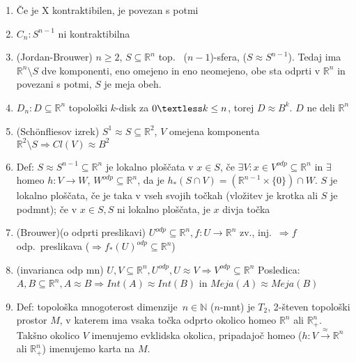 \documentclass[10pt,a4paper]{article}
\begin{document}
\begin{enumerate}
\item Če je X kontraktibilen, je povezan s potmi
    
\item $C_n: S^{n-1}$ ni kontraktibilna
    
\item (Jordan-Brouwer)  $n \geq 2$, $S \subseteq \mathbb{R}^n$ top.~ ($n-1$)-sfera, ($S \approx S^{n-1}$). Tedaj ima $\mathbb{R}^n \setminus S$ dve komponenti, eno omejeno in eno neomejeno, obe sta odprti v $\mathbb{R}^n$ in povezani s potmi, $S$ je meja obeh.
    
\item $D_n: D \subseteq \mathbb{R}^n$  topološki $k$-disk za $0 \textless k \leq n$, torej $D \approx B^k$. $D$ ne deli $\mathbb{R}^n$
    
\item (Schönfliesov izrek) $S^1 \approx S \subseteq \mathbb{R}^2$, $V$ omejena komponenta $\mathbb{R}^2 \setminus S \Rightarrow Cl(V) \approx B^2$
    
\item Def: $S \approx S^{n-1} \subseteq \mathbb{R}^n$ je lokalno ploščata v $x \in S$, če $\exists V: x \in V^{odp} \subseteq \mathbb{R}^n$ in $\exists$ homeo $h: V \rightarrow W$, $W^{odp} \subseteq \mathbb{R}^n$,
    da je $h_\ast(S \cap V) = (\mathbb{R}^{n-1} \times \{ 0\}) \cap W$. \quad $S$ je lokalno ploščata, če je taka v vseh svojih točkah (vložitev je krotka ali $S$ je podmnt);
    če v $x \in S, S$ ni lokalno ploščata, je $x$ divja točka
    
\item (Brouwer)(o odprti preslikavi) $U^{odp} \subseteq \mathbb{R}^n, f:U \rightarrow \mathbb{R}^n$ zv., inj.~$\Rightarrow f$ odp.~preslikava ($\Rightarrow f_\ast(U)^{odp} \subseteq \mathbb{R}^n$)
    
\item (invarianca odp mn) $U, V \subseteq \mathbb{R}^n, U^{odp}, U \approx V \Rightarrow V^{odp} \subseteq \mathbb{R}^n$
    \quad Posledica: $A,B \subseteq \mathbb{R}^n, A \approx B \Rightarrow Int(A) \approx Int(B)$ in $Meja(A) \approx Meja(B)$
    
\item Def: topološka mnogoterost dimenzije~$n \in \mathbb{N}$ ($n$-mnt) je $T_2$, 2-števen topološki prostor $M$, v katerem ima vsaka točka odprto okolico homeo $\mathbb{R}^n$ ali $\mathbb{R}^{n}_+$.
    Takšno okolico $V$ imenujemo evklidska okolica, pripadajoč homeo ($h: V \stackrel{\approx}{\rightarrow} \mathbb{R}^n$ ali $\mathbb{R}^{n}_+$) imenujemo karta na $M$.


\end{enumerate}
\end{document}

